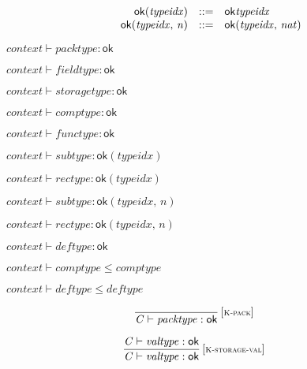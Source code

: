 \vspace{1ex}

$$
\begin{array}{@{}lrrl@{}l@{}}
& {\mathsf{ok}}{({\mathit{typeidx}})} &::=& {\mathsf{ok}}{{\mathit{typeidx}}} \\
& {\mathsf{ok}}{({\mathit{typeidx}},\, {\mathit{n}})} &::=& {\mathsf{ok}}{({\mathit{typeidx}},\, {\mathit{nat}})} \\
\end{array}
$$

$\boxed{{\mathit{context}} \vdash {\mathit{packtype}} : \mathsf{ok}}$

$\boxed{{\mathit{context}} \vdash {\mathit{fieldtype}} : \mathsf{ok}}$

$\boxed{{\mathit{context}} \vdash {\mathit{storagetype}} : \mathsf{ok}}$

$\boxed{{\mathit{context}} \vdash {\mathit{comptype}} : \mathsf{ok}}$

$\boxed{{\mathit{context}} \vdash {\mathit{functype}} : \mathsf{ok}}$

$\boxed{{\mathit{context}} \vdash {\mathit{subtype}} : {\mathsf{ok}}{({\mathit{typeidx}})}}$

$\boxed{{\mathit{context}} \vdash {\mathit{rectype}} : {\mathsf{ok}}{({\mathit{typeidx}})}}$

$\boxed{{\mathit{context}} \vdash {\mathit{subtype}} : {\mathsf{ok}}{({\mathit{typeidx}},\, {\mathit{n}})}}$

$\boxed{{\mathit{context}} \vdash {\mathit{rectype}} : {\mathsf{ok}}{({\mathit{typeidx}},\, {\mathit{n}})}}$

$\boxed{{\mathit{context}} \vdash {\mathit{deftype}} : \mathsf{ok}}$

$\boxed{{\mathit{context}} \vdash {\mathit{comptype}} \leq {\mathit{comptype}}}$

$\boxed{{\mathit{context}} \vdash {\mathit{deftype}} \leq {\mathit{deftype}}}$

\vspace{1ex}

$$
\begin{array}{@{}c@{}}\displaystyle
\frac{
}{
{\mathit{C}} \vdash {\mathit{packtype}} : \mathsf{ok}
} \, {[\textsc{\scriptsize K{-}pack}]}
\qquad
\end{array}
$$

$$
\begin{array}{@{}c@{}}\displaystyle
\frac{
{\mathit{C}} \vdash {\mathit{valtype}} : \mathsf{ok}
}{
{\mathit{C}} \vdash {\mathit{valtype}} : \mathsf{ok}
} \, {[\textsc{\scriptsize K{-}storage{-}val}]}
\qquad
\end{array}
$$

